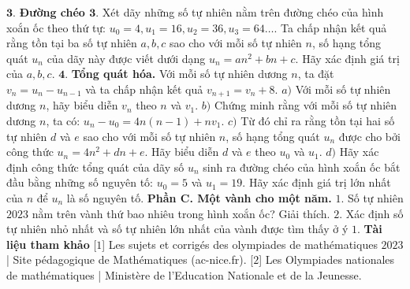 \begin{multicols}{2}
	\vskip 0.05cm
	$\pmb{3.}$  \textbf{\color{cackithi}Đường chéo $\pmb{3.}$}
	\vskip 0.05cm 
	Xét dãy những số tự nhiên nằm trên đường chéo của hình xoắn ốc theo thứ tự: $u_0=4,u_1=16,u_2=36,u_3=64\ldots$. Ta chấp nhận kết quả rằng tồn tại ba số tự nhiên $a,b,c$ sao cho với mỗi số tự nhiên $n$, số hạng tổng quát $u_n$ của dãy này được viết dưới dạng $u_n=an^2+bn+c$. Hãy xác định giá trị của $a,b,c$.
	\vskip 0.05cm 
	$\pmb{4.}$  \textbf{\color{cackithi}Tổng quát hóa.}
	\vskip 0.05cm 
	Với mỗi số tự nhiên dương $n$, ta đặt $v_n=u_n-u_{n-1}$ và ta chấp nhận kết quả $v_{n+1}=v_n+8$.
	\vskip 0.05cm 
	$a)$ Với mỗi số tự nhiên dương $n$, hãy biểu diễn $v_n$ theo $n$ và $v_1$.
	\vskip 0.05cm
	$b)$ Chứng minh rằng với mỗi số tự nhiên dương $n$, ta có: $u_n-u_0=4n(n-1)+nv_1$.
	\vskip 0.05cm
	$c)$ Từ đó chỉ ra rằng tồn tại hai số tự nhiên $d$ và $e$ sao cho với mỗi số tự nhiên $n$, số hạng tổng quát $u_n$ được cho bởi công thức $u_n=4n^2+dn+e$. Hãy biểu diễn $d$ và $e$ theo $u_0$ và $u_1$.
	\vskip 0.05cm 
	$d)$ Hãy xác định công thức tổng quát của dãy số $u_n$ sinh ra đường chéo của hình xoắn ốc bắt đầu bằng những số nguyên tố: $u_0=5$ và $u_1=19$. Hãy xác định giá trị lớn nhất của $n$ để $u_n$ là số nguyên tố. 
	\vskip 0.05cm
	 \textbf{\color{cackithi}Phần C.  Một vành cho một năm.}
	\vskip 0.05cm
	$1.$ Số tự nhiên $2023$ nằm trên vành thứ bao nhiêu trong hình xoắn ốc? Giải thích. 
	\vskip 0.05cm
	$2.$ Xác định số tự nhiên nhỏ nhất và số tự nhiên lớn nhất của vành được tìm thấy ở ý $1$.
	\vskip 0.05cm 
	 \textbf{\color{cackithi}Tài liệu tham khảo}
	\vskip 0.05cm 
	[$1$] Les sujets et corrigés des olympiades de mathématiques $2023$ | Site pédagogique de Mathématiques (ac-nice.fr).
	\vskip 0.05cm
	[$2$] Les Olympiades nationales de mathématiques | Ministère de l'Education Nationale et de la Jeunesse. 
\end{multicols}
